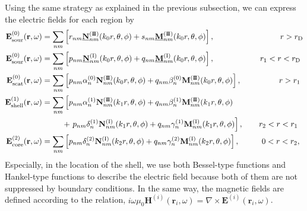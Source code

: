 \documentclass[journal=jacsat,manuscript=article,layout=traditional]{achemso}
\newcommand{\norF}[1]{\underline{\vb{#1}}}
\newcommand{\joinR}{\hspace{-.17em}}
\newcommand{\RomanI}{\scriptsize\textrm{I}}
\newcommand{\RomanIII}{\mbox{\RomanI\joinR\RomanI\joinR\RomanI}}
\begin{document}
Using the same strategy as explained in the previous subsection, we can express the electric fields for each region by
\begin{subequations}
    \begin{align}
            \mathbf{E}_{\textrm{sour}\mathstrut}^{(0)}(\mathbf{r},\omega)
            &= \sum_{nm} \left[r_{nm}\norF{N}_{nm}^{(\RomanIII)}(k_0r,\theta,\phi) + s_{nm}\norF{M}_{nm}^{(\RomanIII)}(k_0r,\theta,\phi)\right], \hspace{2.95 cm} r>r_\mathrm{D}\\
            \mathbf{E}_{\textrm{sour}\mathstrut}^{(0)}(\mathbf{r},\omega)
            &= \sum_{nm} \left[p_{nm}\norF{N}_{nm}^{(\RomanI)}(k_0r,\theta,\phi) + q_{nm}\norF{M}_{nm}^{(\RomanI)}(k_0r,\theta,\phi)\right], \hspace{2.05 cm} r_1<r<r_\mathrm{D}\\
            \mathbf{E}_{\textrm{scat}\mathstrut}^{(0)}(\mathbf{r},\omega)
            &= \sum_{nm} \left[p_{nm}\alpha_n^{(0)}\mathbf{N}_{nm}^{(\RomanIII)}(k_0r,\theta,\phi) + q_{nm}\beta_n^{(0)}\mathbf{M}_{nm}^{(\RomanIII)}(k_0r,\theta,\phi)\right], \hspace{1.69 cm} r>r_1\\
            \nonumber
            \mathbf{E}_{\textrm{shell}\mathstrut}^{(1)}(\mathbf{r},\omega)
            &= \sum_{nm} \left[p_{nm}\alpha_n^{(1)}\mathbf{N}_{nm}^{(\RomanIII)}(k_1r,\theta,\phi) + q_{nm}\beta_n^{(1)}\mathbf{M}_{nm}^{(\RomanIII)}(k_1r,\theta,\phi)\right.\\
            &\hspace{.9 cm}+ \left.p_{nm}\delta_n^{(1)}\mathbf{N}_{nm}^{(\RomanI)}(k_1r,\theta,\phi) + q_{nm}\gamma_n^{(1)}\mathbf{M}_{nm}^{(\RomanI)}(k_1r,\theta,\phi)\right], \qquad r_2<r<r_1\\
            \mathbf{E}_{\textrm{core}\mathstrut}^{(2)}(\mathbf{r},\omega)
            &= \sum_{nm} \left[p_{nm}\delta_n^{(2)}\mathbf{N}_{nm}^{(\RomanI)}(k_2r,\theta,\phi) + q_{nm}\gamma_n^{(2)}\mathbf{M}_{nm}^{(\RomanI)}(k_2r,\theta,\phi)\right], \hspace{1.0 cm} 0<r<r_2,
    \end{align}
    \label{Eq:ECSexpand}%
\end{subequations}
Especially, in the location of the shell, we use both Bessel-type functions and Hankel-type functions to describe the electric field because both of them are not suppressed by boundary conditions.
In the same way, the magnetic fields are defined according to the relation, $i\omega\mu_0\mathbf{H}^{(i)}(\mathbf{r}_{i},\omega) = \nabla\times\mathbf{E}^{(i)}(\mathbf{r}_{i},\omega)$.
\end{document}
